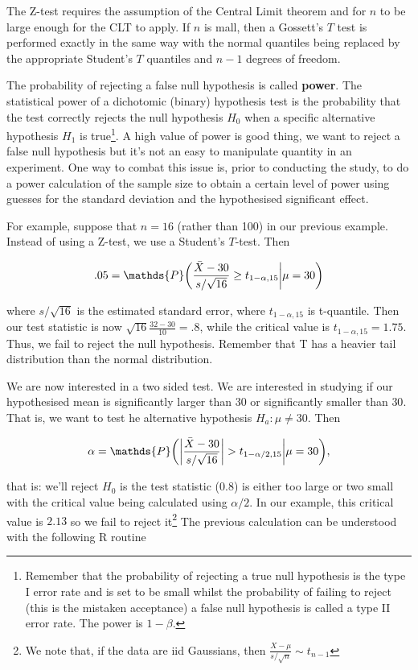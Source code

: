 \documentclass{homework}
\begin{document}
The Z-test requires the assumption of the Central Limit theorem and for $n$ to be large enough for the CLT to apply. If $n$ is mall, then a Gossett's $T$ test is performed exactly in the same way with the normal quantiles being replaced by the appropriate Student's $T$ quantiles and $n-1$ degrees of freedom. 

The probability of rejecting a false null hypothesis is called \textbf{power}. The statistical power of a dichotomic (binary) hypothesis test is the probability that the test correctly rejects the null hypothesis $H_0$ when a specific alternative hypothesis $H_1$ is true\footnote{Remember that the probability of rejecting a true null hypothesis is the type I error rate and is set to be small whilst the probability of failing to reject (this is the mistaken acceptance) a false null hypothesis is called a type II error rate. The power is $1-\beta$.}. A high value of power is good thing, we want to reject a false null hypothesis but it's not an easy to manipulate quantity in an experiment. One way to combat this issue is, prior to conducting the study, to do a power calculation of the sample size to obtain a certain level of power using guesses for the standard deviation and the hypothesised significant effect.

For example, suppose that $n=16$ (rather than 100) in our previous example. Instead of using a Z-test, we use a Student's $T$-test. Then 

$$
.05 = \mathds{P}\bigg(\frac{\Bar{X}-30}{s/\sqrt{16}} \geq t_{1-\alpha, 15} \bigg| \mu = 30\bigg)
$$

where $s/\sqrt{16}$ is the estimated standard error, where $t_{1-\alpha, 15}$ is t-quantile. Then our test statistic is now $\sqrt{16}\frac{32-30}{10} = .8$, while the critical value is $t_{1-\alpha, 15} = 1.75$. Thus, we fail to reject the null hypothesis. Remember that T has a heavier tail distribution than the normal distribution.

We are now interested in a two sided test. We are interested in studying if our hypothesised mean is significantly larger than $30$ or significantly smaller than $30$. That is, we want to test he alternative hypothesis $H_a: \mu \neq 30$. Then

$$
\alpha = \mathds{P}\bigg(\bigg|\frac{\Bar{X}-30}{s/\sqrt{16}}\bigg| > t_{1-\alpha/2, 15}\bigg| \mu = 30\bigg),
$$

that is: we'll reject $H_0$ is the test statistic (0.8) is either too large or two small with the critical value being calculated using $\alpha/2$. In our example, this critical value is $2.13$ so we fail to reject it\footnote{We note that, if the data are iid Gaussians, then $\frac{X-\mu}{s/\sqrt{n}} \sim t_{n-1}$} The previous calculation can be understood with the following R routine 
\end{document}
